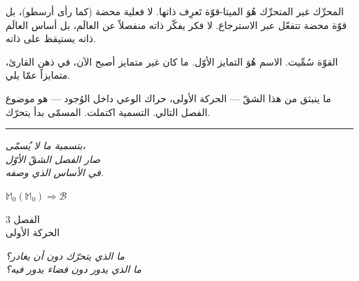 \documentclass[10pt, openany, oneside]{book}
\renewcommand{\large}{\fontsize{11.5}{14}\selectfont}
\renewcommand{\huge}{\fontsize{17}{21}\selectfont}
\begin{document}
المحرِّك غير المتحرِّك هُوَ الميتا-قوّة تَعرِف ذاتها. لا فعلية محضة (كما رأى أرسطو)، بل قوّة محضة تتفعّل عبر الاسترجاع. لا فكر يفكّر ذاته منفصلاً عن العالَم، بل أساس العالَم ذاته يستيقظ على ذاته.

القوّة سُمِّيت. الاسم هُوَ التمايز الأوّل. ما كان غير متمايز أصبح الآن، في ذهن القارئ، متمايزاً عمّا يلي.

ما ينبثق من هذا الشقّ --- الحركة الأولى، حراك الوعي داخل الوُجود --- هو موضوع الفصل التالي. التسمية اكتملت. المسمّى بدأ يتحرّك.

\vspace{2em}

\begin{center}
    \rule{0.15\textwidth}{0.3pt}
\end{center}

\vspace{0.5em}

\begin{center}
    \itshape
    بتسمية ما لا يُسمّى،\\
    صار الفصل الشقّ الأوّل\\
    في الأساس الذي وصفه.
\end{center}

\vspace{0.5em}

\begin{center}
    $\mathbb{M}_0(\mathbb{M}_0) \Rightarrow \mathcal{B}$
\end{center}

%
%
%

\newpage

\begin{center}
    {\huge الفصل 3}\\[0.3em]
    {\large الحركة الأولى}
\end{center}

\vspace{1.5em}

\begin{center}
    \itshape
    ما الذي يتحرّك دون أن يغادر؟\\
    ما الذي يدور دون فضاء يدور فيه؟
\end{center}

\vspace{2em}
\end{document}
